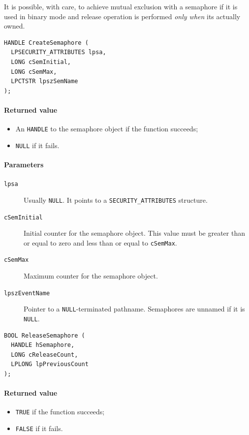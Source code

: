 It is possible, with care, to achieve mutual exclusion with a semaphore if it is used in binary mode and release operation is performed \emph{only when} its actually owned.

\begin{verbatim}
HANDLE CreateSemaphore (
  LPSECURITY_ATTRIBUTES lpsa,
  LONG cSemInitial,
  LONG cSemMax,
  LPCTSTR lpszSemName
);
\end{verbatim}

\paragraph{Returned value}
\begin{itemize}
\item An \texttt{HANDLE} to the semaphore object if the function succeeds;
\item \texttt{NULL} if it fails.
\end{itemize}

\paragraph{Parameters}
\begin{description}
\item [\texttt{lpsa}] Usually \texttt{NULL}. It points to a \texttt{SECURITY\_ATTRIBUTES} structure.
\item [\texttt{cSemInitial}] Initial counter for the semaphore object. This value must be greater than or equal to zero and less than or equal to \texttt{cSemMax}.
\item [\texttt{cSemMax}] Maximum counter for the semaphore object.
\item [\texttt{lpszEventName}] Pointer to a \texttt{NULL}-terminated pathname. Semaphores are unnamed if it is \texttt{NULL}.
\end{description}

\begin{verbatim}
BOOL ReleaseSemaphore (
  HANDLE hSemaphore,
  LONG cReleaseCount,
  LPLONG lpPreviousCount
);
\end{verbatim}

\paragraph{Returned value}
\begin{itemize}
\item \texttt{TRUE} if the function succeeds;
\item \texttt{FALSE} if it fails.
\end{itemize}

